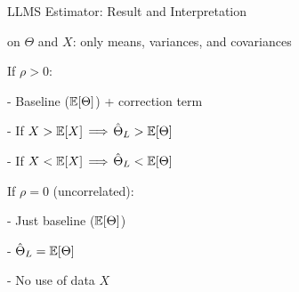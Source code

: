 \begin{frame}{LLMS Estimator: Result and Interpretation}


\vspace{-0.4cm}

\plitemsep 0.1in
\bci
\item<2->  on $\Theta$ and $X$: only means, variances, and covariances


\medskip

{
\plitemsep 0.05in

  \bci
\item<3-> If $\rho >0:$


- Baseline ($\mathbb{E}[ \Theta ]$) + correction term

- If $X > \mathbb{E}[ X ]$ $\Longrightarrow$ $\hat{\Theta}_L > \mathbb{E}[ \Theta ]$

- If $X < \mathbb{E}[ X ]$ $\Longrightarrow$ $\hat{\Theta}_L < \mathbb{E}[ \Theta ]$
\eci
}
{
\plitemsep 0.05in
\bci
\item<4-> If $\rho =0$ (uncorrelated):

- Just baseline ($\mathbb{E}[ \Theta ]$)

- $\hat{\Theta}_L = \mathbb{E}[ \Theta ]$

- No use of data $X$
\eci

}

\eci

\end{frame}

